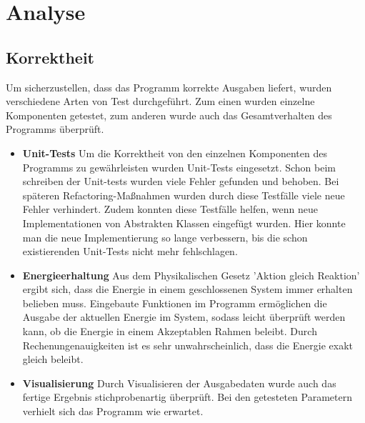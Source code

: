 \documentclass[
	12pt,
	a4paper,
	BCOR10mm,
	DIV14,
	headsepline,
]{scrreprt}
\begin{document}
\section{Analyse}
\subsection{Korrektheit}
	Um sicherzustellen, dass das Programm korrekte Ausgaben liefert, wurden verschiedene Arten von Test durchgeführt. Zum einen wurden einzelne Komponenten getestet, zum anderen wurde auch das Gesamtverhalten des Programms überprüft.
	\begin{itemize}
		\item \textbf{Unit-Tests} Um die Korrektheit von den einzelnen Komponenten des Programms zu gewährleisten wurden Unit-Tests eingesetzt. Schon beim schreiben der Unit-tests wurden viele Fehler gefunden und behoben. Bei späteren Refactoring-Maßnahmen wurden durch diese Testfälle viele neue Fehler verhindert. Zudem konnten diese Testfälle helfen, wenn neue Implementationen von Abstrakten Klassen eingefügt wurden. Hier konnte man die neue Implementierung so lange verbessern, bis die schon existierenden Unit-Tests nicht mehr fehlschlagen.
		\item \textbf{Energieerhaltung} Aus dem Physikalischen Gesetz 'Aktion gleich Reaktion' ergibt sich, dass die Energie in einem geschlossenen System immer erhalten belieben muss. Eingebaute Funktionen im Programm ermöglichen die Ausgabe der aktuellen Energie im System, sodass leicht überprüft werden kann, ob die Energie in einem Akzeptablen Rahmen beleibt. Durch Rechenungenauigkeiten ist es sehr unwahrscheinlich, dass die Energie exakt gleich beleibt.
		\item \textbf{Visualisierung} Durch Visualisieren der Ausgabedaten wurde auch das fertige Ergebnis stichprobenartig überprüft. Bei den getesteten Parametern verhielt sich das Programm wie erwartet.
	\end{itemize}
\end{document}
